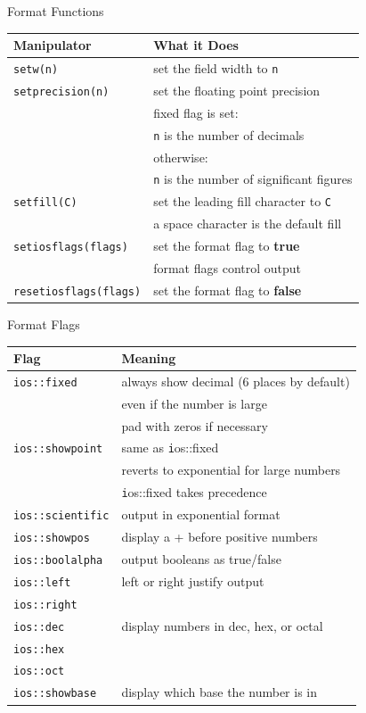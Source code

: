 \documentclass[xcolor={dvipsnames}]{beamer}
\begin{document}
\begin{frame}{Format Functions}
\begin{tabular}{|l|l|}
\hline
\textbf{Manipulator} & \textbf{What it Does} \\
\hline
\texttt{setw(n)} & set the field width to \texttt n \\
\hline
\texttt{setprecision(n)} & set the floating point precision \\
			    & fixed flag is set:\\
			    & \texttt{n} is the number of decimals \\
			   & otherwise: \\
			   & \texttt{n} is the number of significant figures\\
\hline
\texttt{setfill(C)} & set the leading fill character to \texttt{C}\\
  		    	& a space character is the default fill\\
\hline
\hline
\texttt{setiosflags(flags)}    & set the format flag to \textbf{true}\\
				& format flags control output\\
\hline
\texttt{resetiosflags(flags)} & set the format flag to \textbf{false}\\
\hline
\end{tabular}
\end{frame}
\begin{frame}{Format Flags}
\begin{tabular}{ | l|l|}
\hline
\textbf{Flag} & \textbf{Meaning} \\
\hline
\hline
\texttt{ios::fixed} & always show decimal (6 places by default)\\
		       & even if the number is large\\
		       & pad with zeros if necessary\\
\hline
\texttt{ios::showpoint}&  same as \texttt ios::fixed\\
			    & reverts to exponential for large numbers\\
			    &\texttt ios::fixed takes precedence\\

\hline
\hline
\texttt{ios::scientific} & output in exponential format\\
\hline
\texttt{ios::showpos} & display a + before positive numbers \\
\hline
\texttt{ios::boolalpha} & output booleans as true/false\\
\hline
\hline
\texttt{ios::left} & left or right justify output\\
\texttt{ios::right} &\\
\hline
\hline
\texttt{ios::dec} &display  numbers in dec, hex, or octal\\
\texttt{ios::hex} & \\
\texttt{ios::oct} & \\
\hline
\texttt{ios::showbase} & display which base the number is in\\
\hline
\end{tabular}
\end{frame}
\end{document}
